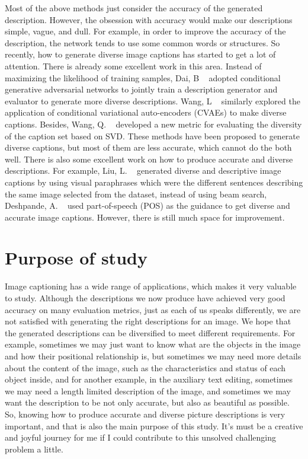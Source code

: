 \documentclass[12pt]{article}
\begin{document}
	Most of the above methods just consider the accuracy of the generated description. However, the obsession with accuracy would make our descriptions simple, vague, and dull. For example, in order to improve the accuracy of the description, the network tends to use some common words or structures. So recently, how to generate diverse image captions has started to get a lot of attention. There is already some excellent work in this area. Instead of maximizing the likelihood of training samples, Dai, B ~\cite{dai2017towards} adopted conditional generative adversarial networks to jointly train a description generator and evaluator to generate more diverse descriptions. Wang, L ~\cite{wang2017diverse} similarly explored the application of conditional variational auto-encoders (CVAEs) to make diverse captions. Besides, Wang, Q. ~\cite{wang2017diverse} developed a new metric for evaluating the diversity of the caption set based on SVD. These methods have been proposed to generate diverse captions, but most of them are less accurate, which cannot do the both well.
	There is also some excellent work on how to produce accurate and diverse descriptions. For example, Liu, L. ~\cite{liu2019generating} generated diverse and descriptive image captions by using visual paraphrases which were the different sentences describing the same image selected from the dataset, instead of using beam search, Deshpande, A. ~\cite{deshpande2019fast} used part-of-speech (POS) as the guidance to get diverse and accurate image captions. However, there is still much space for improvement.
	
	\section{Purpose of study}
	Image captioning has a wide range of applications, which makes it very valuable to study. Although the descriptions we now produce have achieved very good accuracy on many evaluation metrics, just as each of us speaks differently, we are not satisfied with generating the right descriptions for an image. We hope that the generated descriptions can be diversified to meet different requirements. For example, sometimes we may just want to know what are the objects in the image and how their positional relationship is, but sometimes we may need more details about the content of the image, such as the characteristics and status of each object inside, and for another example, in the auxiliary text editing, sometimes we may need a length limited description of the image, and sometimes we may want the description to be not only accurate, but also as beautiful as possible. So, knowing how to produce accurate and diverse picture descriptions is very important, and that is also the main purpose of this study. It's must be a creative and joyful journey for me if I could contribute to this unsolved challenging problem a little.
	
\end{document}
